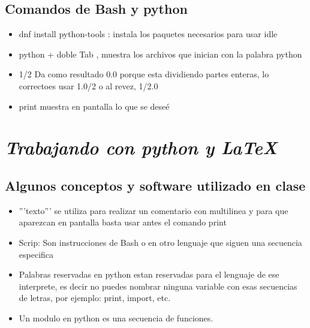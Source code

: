 \documentclass{book}
\begin{document}
	\subsection {Comandos de Bash y python} %
	\begin{itemize}%
		\item dnf install python-tools : instala los paquetes necesarios para usar idle
		\item python + doble Tab , muestra los archivos que inician con la palabra python
		\item 1/2 Da como resultado 0.0 porque esta dividiendo partes enteras, lo correctoes usar 1.0/2 o al revez, 1/2.0
		\item print muestra en pantalla lo que se deseé
		
		
	\end{itemize}%
	
	
	
	


\newpage
\section{\textit{Trabajando con python y \LaTeX}}%
	\begin{flushright}
	\date{11 de enero de 2019}
	\end{flushright}

	\subsection {Algunos conceptos y software utilizado en clase}%
	\begin{itemize}
		\item '''texto''' se utiliza para realizar un comentario con multilinea y para que aparezcan en pantalla basta usar antes el comando print 			
		\item Scrip: Son instrucciones de Bash o en otro lenguaje que siguen una secuencia especifica			
		\item Palabras reservadas en python estan reservadas para el lenguaje de ese interprete, es decir no puedes nombrar ninguna variable con esas secuencias de letras, por ejemplo: print, import, etc.
		\item Un modulo en python es una secuencia de funciones.
	\end{itemize}
	
\end{document}
